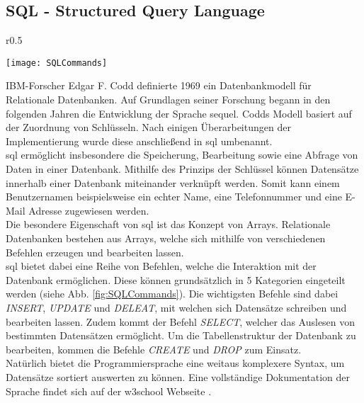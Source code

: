 \subsection{SQL - Structured Query Language}
\begin{wrapfigure}{r}{0.5\textwidth}
    \vspace{-1.2cm}
    \captionsetup{justification=centering,format=plain, font=small}
    \begin{center}
      \texttt{[image: SQLCommands]}
    \end{center}
    \vspace{-0.5cm}
    \caption{SQL Befehls Kategorien \cite{SQLCommands}}
    \label{fig:SQLCommands}
    \vspace{-0.5cm}
  \end{wrapfigure}
IBM-Forscher Edgar F. Codd definierte 1969 ein Datenbankmodell für Relationale Datenbanken. Auf Grundlagen seiner Forschung begann in den folgenden Jahren die Entwicklung der Sprache \ac{sequel}. Codds Modell basiert auf der Zuordnung von Schlüsseln. Nach einigen Überarbeitungen der Implementierung wurde diese anschließend in \ac{sql} umbenannt.\cite{SQL}\\
\ac{sql} ermöglicht insbesondere die Speicherung, Bearbeitung sowie eine Abfrage von Daten in einer Datenbank. Mithilfe des Prinzips der Schlüssel können Datensätze innerhalb einer Datenbank miteinander verknüpft werden. Somit kann einem Benutzernamen beispielsweise ein echter Name, eine Telefonnummer und eine E-Mail Adresse zugewiesen werden.\cite{SQL}\\
Die besondere Eigenschaft von \ac{sql} ist das Konzept von Arrays. Relationale Datenbanken bestehen aus Arrays, welche sich mithilfe von verschiedenen Befehlen erzeugen und bearbeiten lassen.\cite{SQL}\\
\ac{sql} bietet dabei eine Reihe von Befehlen, welche die Interaktion mit der Datenbank ermöglichen. Diese können grundsätzlich in 5 Kategorien eingeteilt werden (siehe Abb. \ref{fig:SQLCommands}). Die wichtigsten Befehle sind dabei \textit{INSERT}, \textit{UPDATE} und \textit{DELEAT}, mit welchen sich Datensätze schreiben und bearbeiten lassen. Zudem kommt der Befehl \textit{SELECT}, welcher das Auslesen von bestimmten Datensätzen ermöglicht. Um die Tabellenstruktur der Datenbank zu bearbeiten, kommen die Befehle \textit{CREATE} und \textit{DROP} zum Einsatz.\cite{SQLCommands}\\
Natürlich bietet die Programmiersprache eine weitaus komplexere Syntax, um Datensätze sortiert auswerten zu können. Eine vollständige Dokumentation der Sprache findet sich auf der w3school Webseite \cite{SQLDoku}.